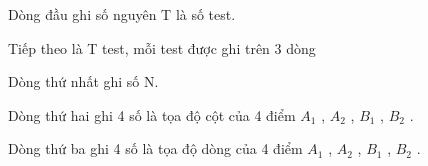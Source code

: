 Dòng đầu ghi số nguyên T là số test.

Tiếp theo là T test, mỗi test được ghi trên 3 dòng

Dòng thứ nhất ghi số N.

Dòng thứ hai ghi 4 số là tọa độ cột của 4 điểm $A_{1}$ , $A_{2}$ , $B_{1}$ , $B_{2}$ .

Dòng thứ ba ghi 4 số là tọa độ dòng của 4 điểm $A_{1}$ , $A_{2}$ , $B_{1}$ , $B_{2}$ .